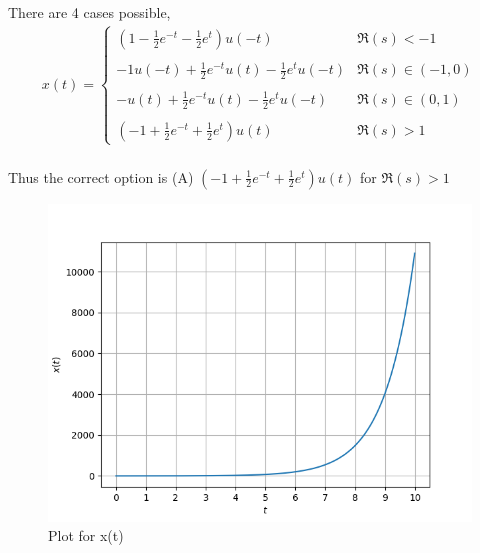 \documentclass[journal,12pt,onecolumn]{IEEEtran}
\theoremstyle{remark}
\begin{document}
There are 4 cases possible,
\begin{align}
x(t)=
\begin{cases}
        \left(1-\frac{1}{2}e^{-t}-\frac{1}{2}e^t\right)u(-t) & \Re(s)<-1 \\
        \\
        -1u(-t)+\frac{1}{2}e^{-t}u(t)-\frac{1}{2}e^tu(-t) & \Re(s)\in(-1,0)\\
        \\
        -u(t)+\frac{1}{2}e^{-t}u(t)-\frac{1}{2}e^tu(-t) & \Re(s)\in(0,1)\\
        \\
        \left(-1+\frac{1}{2}e^{-t}+\frac{1}{2}e^t\right)u(t) & \Re(s)>1
\end{cases}
\end{align}\\
 
Thus the correct option is (A) $\left(-1+\frac{1}{2}e^{-t}+\frac{1}{2}e^t\right)u(t)$ for $\Re(s)>1$

\begin{figure}[H]
  \centering
  \includegraphics[width=1.0\columnwidth]{figs/plot1.png}
  \caption{Plot for x(t)}
  \label{fig:fig1}
\end{figure}
\end{document}
